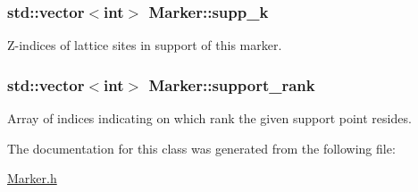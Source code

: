 \subsubsection[{\texorpdfstring{supp\+\_\+k}{supp_k}}]{\setlength{\rightskip}{0pt plus 5cm}std\+::vector$<$int$>$ Marker\+::supp\+\_\+k}\hypertarget{class_marker_ab06b6d2cfb7221579cf32538f0c79b82}{}\label{class_marker_ab06b6d2cfb7221579cf32538f0c79b82}


Z-\/indices of lattice sites in support of this marker. 

\subsubsection[{\texorpdfstring{support\+\_\+rank}{support_rank}}]{\setlength{\rightskip}{0pt plus 5cm}std\+::vector$<$int$>$ Marker\+::support\+\_\+rank}\hypertarget{class_marker_a183752ab41e56b159570a103c25f2aec}{}\label{class_marker_a183752ab41e56b159570a103c25f2aec}


Array of indices indicating on which rank the given support point resides. 



The documentation for this class was generated from the following file\+:\begin{DoxyCompactItemize}
\item 
\hyperlink{_marker_8h}{Marker.\+h}\end{DoxyCompactItemize}
